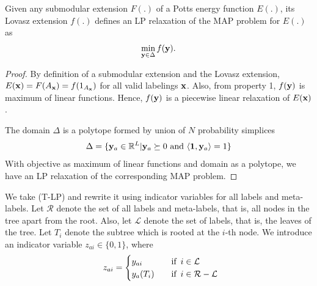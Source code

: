 {\lemma Given any submodular extension $F(.)$ of a Potts energy function $E(.)$, its Lovasz extension $f(.)$ defines an LP relaxation of the MAP problem for $E(.)$ as 
\begin{align}
    \min_{{\bf y} \in \Delta} f({\bf y}).
\end{align}
\begin{proof}
    By definition of a submodular extension and the Lovasz extension, $E({\bf x}) = F(A_{\bf x}) = f(1_{A_{\bf x}})$ for all valid labelings ${\bf x}$. Also, from property 1, $f({\bf y})$ is maximum of linear functions. Hence, $f({\bf y})$ is a piecewise linear relaxation of $E({\bf x})$.

    The domain $\Delta$ is a polytope formed by union of $N$ probability simplices
\begin{equation}
    \Delta = \{{\bf y}_a \in \mathbb{R}^L | {\bf y}_a \succeq 0  \textrm{ and } \langle {\bf 1}, {\bf y}_a \rangle = 1\}
\end{equation}
With objective as maximum of linear functions and domain as a polytope, we have an LP relaxation of the corresponding MAP problem.
\end{proof}

 We take (T-LP) and rewrite it using indicator variables for all labels and meta-labels. Let $\mathcal R$ denote the set of all labels and meta-labels, that is, all nodes in the tree apart from the root. Also, let $\mathcal L$ denote the set of labels, that is, the leaves of the tree. Let $T_i$ denote the subtree which is rooted at the $i$-th node. We introduce an indicator variable $z_{ai} \in \{0, 1\}$, where
\begin{align}
    \enskip  z_{ai} =  \begin{cases} 
        y_{ai} \quad &\text{if} \enskip i \in {\mathcal L} \\
        y_{a}(T_i) \quad &\text{if} \enskip i \in {\mathcal R - \mathcal L} \\
    \end{cases}
\end{align}

}
